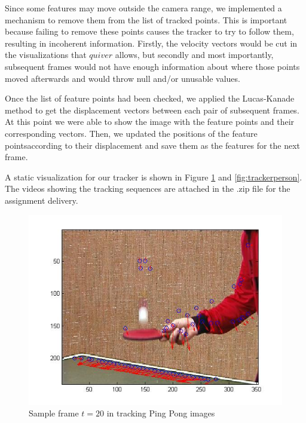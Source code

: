 \documentclass[11pt]{article}
\begin{document}
Since some features may move outside the camera range, we implemented a mechanism to remove them from the list of tracked points. This is important because failing to remove these points causes the tracker to try to follow them, resulting in incoherent information. Firstly, the velocity vectors would be cut in the visualizations that $quiver$ allows, but secondly and most importantly, subsequent frames would not have enough information about where those points moved afterwards and would throw null and/or unusable values.  

Once the list of feature points had been checked, we applied the Lucas-Kanade method to get the displacement vectors between each pair of subsequent frames. At this point we were able to show the image with the feature points and their corresponding vectors. Then, we updated the positions of the feature pointsaccording to their displacement and save them as the features for the next frame. 

A static visualization for our tracker is shown in Figure \ref{fig:tracker_pingpong} and \ref{fig:trackerperson}. The videos showing the tracking sequences are attached in the .zip file for the assignment delivery.

\begin{figure}[H] \centering
	\includegraphics[width=.8\textwidth]{imgs/tracker_pingpong.jpg}
	\caption{Sample frame $t = 20$ in tracking Ping Pong images}
	\label{fig:tracker_pingpong}
\end{figure}
\end{document}
